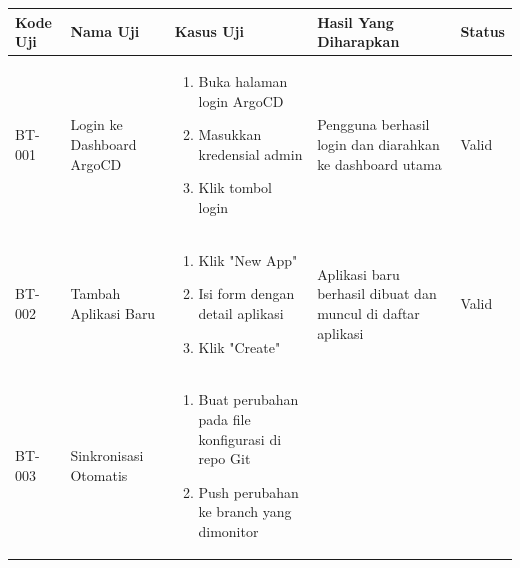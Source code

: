 \begin{table}[h]
  \centering
  \small
  \begin{adjustbox}{width=\textwidth}
    \begin{tabular}{|p{0.8cm}|p{2.2cm}|p{4cm}|p{3.5cm}|p{1.2cm}|}
      \hline
      \textbf{Kode Uji} & \textbf{Nama Uji}         & \textbf{Kasus Uji}                                                & \textbf{Hasil Yang Diharapkan}                                     & \textbf{Status} \\
      \hline
      BT-001            & Login ke Dashboard ArgoCD & \begin{enumerate}[leftmargin=*,noitemsep,topsep=0pt,label=\arabic*.,widest=99]
                                                        \item Buka halaman login ArgoCD
                                                        \item Masukkan kredensial admin
                                                        \item Klik tombol login
                                                      \end{enumerate}  & Pengguna berhasil login dan diarahkan ke dashboard utama           & Valid                                                            \\ \hline
      BT-002            & Tambah Aplikasi Baru      & \begin{enumerate}[leftmargin=*,noitemsep,topsep=0pt,label=\arabic*.,widest=99]
                                                        \item Klik "New App"
                                                        \item Isi form dengan detail aplikasi
                                                        \item Klik "Create"
                                                      \end{enumerate} & Aplikasi baru berhasil dibuat dan muncul di daftar aplikasi        & Valid                                                             \\ \hline
      BT-003            & Sinkronisasi Otomatis     & \begin{enumerate}[leftmargin=*,noitemsep,topsep=0pt,label=\arabic*.,widest=99]
                                                        \item Buat perubahan pada file konfigurasi di repo Git
                                                        \item Push perubahan ke branch yang dimonitor

\end{enumerate}
\end{tabular}
\end{adjustbox}
\end{table}
